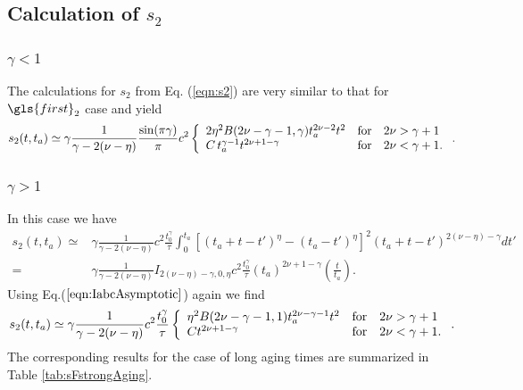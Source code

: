 \subsection*{Calculation of $s_2$}

\subsubsection{$\gamma<1$}
The calculations for $s_2$ from Eq. (\ref{eqn:s2}) are very similar to that for $\gls{first}_{2}$ case and yield
\begin{align}
s_{2}(t,t_a) \simeq \gamma\frac{ 1}{\gamma-2(\nu-\eta)} \frac{\sin(\pi \gamma)}{\pi} c^2  \left\{ \begin{array}{l l l}
2 \eta^2 B(2\nu -\gamma -1,\gamma)  t_a^{2\nu-2} t^2 & \mathrm{for}& 2\nu> \gamma+1\\
C \, t_a^{\gamma-1}t^{2\nu + 1-\gamma} & \mathrm{for} & 2\nu < \gamma+1.
\end{array} \right. .
\end{align}

\subsubsection{$\gamma>1$}
In this case we have 
\begin{align}
 s_{2}(t,t_a) \simeq& \gamma \frac{1}{\gamma-2(\nu-\eta)}c^2 \frac{t_0^{\gamma}}{\tau}  \int^{t_a}_{0} \left[ (t_a+t-t')^{\eta}-(t_a-t')^{\eta} \right]^2 (t_a+t-t')^{2(\nu-\eta)-\gamma} dt' \\
  =& \gamma \frac{1}{\gamma-2(\nu-\eta)}I_{2(\nu-\eta)-\gamma,0,\eta} c^2 \frac{t_0^{\gamma}}{\tau} (t_a)^{2\nu+1- \gamma} \left(\frac{t}{t_a}\right) .
\end{align}
Using Eq.($\ref{eqn:IabcAsymptotic}$) again we find
\begin{align}
s_{2}(t,t_a) \simeq \gamma \frac{1}{\gamma-2(\nu-\eta)} c^2 \frac{t_0^{\gamma}}{\tau}  \left\{ \begin{array}{l l l}
\eta^2  B(2\nu -\gamma -1,1)t_a^{2\nu -\gamma -1} t^2  &\mathrm{for} & 2\nu > \gamma +1 \\
C t^{2\nu +1-\gamma } & \mathrm{for} & 2\nu < \gamma + 1.
\end{array} \right. .
\end{align}
The corresponding results for the case of long aging times are summarized in Table \ref{tab:sFstrongAging}.


